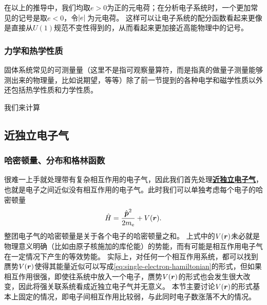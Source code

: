 \documentclass[hyperref, UTF8, a4paper]{ctexart}
\newcommand*{\concept}[1]{\underline{\textbf{#1}}}
\begin{document}
在以上的推导中，我们均取$e>0$为正的元电荷；在分析电子系统时，一个更加常见的记号是取$e<0$，令$\abs*{e}$为元电荷。
这样可以让电子系统的配分函数看起来更像是直接从$U(1)$规范不变性得到的，从而看起来更加接近高能物理中的记号。

\subsubsection{力学和热学性质}

固体系统常见的可测量量（这里不是指可观察量算符，而是指真的做量子测量能够测出来的物理量，比如说期望，等等）除了前一节提到的各种电学和磁学性质以外还包括热学性质和力学性质。

我们来计算
 
\subsection{近独立电子气}

\subsubsection{哈密顿量、分布和格林函数}

很难一上手就处理带有复杂相互作用的电子气，因此我们首先处理\concept{近独立电子气}，也就是电子之间近似没有相互作用的电子气。此时我们可以单独考虑每个电子的哈密顿量
\begin{equation}
    \hat{H} = \frac{\hat{\vb*{p}}^2}{2m_\text{e}} + V(\vb*{r}).
    \label{eq:single-electron-hamiltonian}
\end{equation}
整团电子气的哈密顿量是关于各个电子的哈密顿量之和。
上式中的$V(\vb*{r})$未必就是物理意义明确（比如由原子核施加的库伦能）的势能，而有可能是相互作用电子气在一定情况下产生的等效势能。
实际上，对任何一个相互作用系统，都可以找到赝势$V(\vb*{r})$使得其能量近似可以写成\eqref{eq:single-electron-hamiltonian}的形式，但如果相互作用很强，即使往系统中放入一个电子，赝势$V(\vb*{r})$的形式也会发生很大改变，因此将强关联系统看成近独立电子气并无意义。
本节主要讨论$V(\vb*{r})$的形式基本上固定的情况，即电子间相互作用比较弱，与此同时电子数涨落不大的情况。
\end{document}
